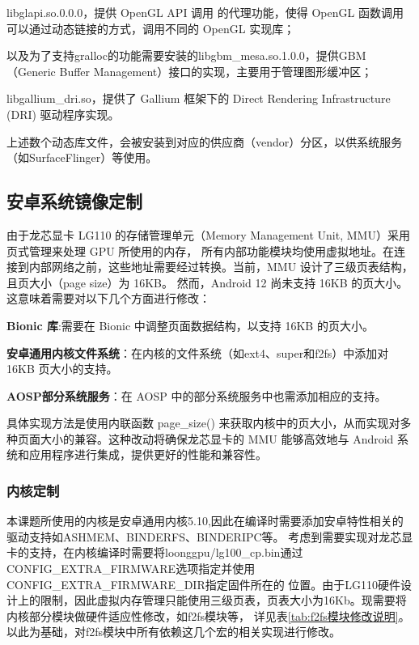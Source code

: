 libglapi.so.0.0.0，提供 OpenGL API 调用 的代理功能，使得 OpenGL 函数调用可以通过动态链接的方式，调用不同的 OpenGL 实现库；

以及为了支持gralloc的功能需要安装的libgbm\_mesa.so.1.0.0，提供GBM（Generic Buffer Management）接口的实现，主要用于管理图形缓冲区；

libgallium\_dri.so，提供了 Gallium 框架下的 Direct Rendering Infrastructure (DRI) 驱动程序实现。

上述数个动态库文件，会被安装到对应的供应商（vendor）分区，以供系统服务（如SurfaceFlinger）等使用。


\subsection{安卓系统镜像定制}
由于龙芯显卡 LG110 的存储管理单元（Memory Management Unit, MMU）采用页式管理来处理 GPU 所使用的内存，
所有内部功能模块均使用虚拟地址。在连接到内部网络之前，这些地址需要经过转换。当前，MMU 设计了三级页表结构，且页大小（page size）为 16KB。
然而，Android 12 尚未支持 16KB 的页大小。这意味着需要对以下几个方面进行修改：

\textbf{Bionic 库}:需要在 Bionic 中调整页面数据结构，以支持 16KB 的页大小。

\textbf{安卓通用内核文件系统}：在内核的文件系统（如ext4、super和f2fs）中添加对 16KB 页大小的支持。

\textbf{AOSP部分系统服务}：在 AOSP 中的部分系统服务中也需添加相应的支持。

具体实现方法是使用内联函数 page\_size() 来获取内核中的页大小，从而实现对多种页面大小的兼容。这种改动将确保龙芯显卡的 MMU 
能够高效地与 Android 系统和应用程序进行集成，提供更好的性能和兼容性。


\subsubsection{内核定制}
本课题所使用的内核是安卓通用内核5.10,因此在编译时需要添加安卓特性相关的驱动支持如ASHMEM、BINDERFS、BINDERIPC等。
考虑到需要实现对龙芯显卡的支持，在内核编译时需要将loonggpu/lg100\_cp.bin通过CONFIG\_EXTRA\_FIRMWARE选项指定并使用CONFIG\_EXTRA\_FIRMWARE\_DIR指定固件所在的
位置。由于LG110硬件设计上的限制，因此虚拟内存管理只能使用三级页表，页表大小为16Kb。现需要将内核部分模块做硬件适应性修改，如f2fs模块等，
详见表\ref{tab:f2fs模块修改说明}。以此为基础，对f2fs模块中所有依赖这几个宏的相关实现进行修改。


